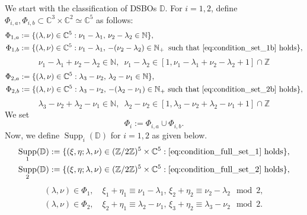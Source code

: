 \documentclass[a4paper,11pt,reqno]{amsart}
\newcommand{\DD}{\mathbb{D}}
\newcommand{\0}{{\bf 0}}
\newcommand{\N}{\mathbb{N}}
\newcommand{\Z}{\mathbb{Z}}
\newcommand{\C}{\mathbb{C}}
\newcommand{\1}{{\bf 1}}
\DeclareMathOperator{\Supp}{Supp}
\theoremstyle{plain}
\theoremstyle{definition}
\numberwithin{equation}{section}
\theoremstyle{definition}
\begin{document}
We start with the classification of DSBOs $\mathbb{D}$.
For $i=1,2$, define $\Phi_{i,a}, \Phi_{i,b} \subset \C^3\times \C^2 \simeq \C^5$ 
as follows:
\begin{align}
    \Phi_{1,a} &:= \{(\lambda, \nu) \in \C^5: \nu_1-\lambda_1,\, \nu_2-\lambda_2 \in \N\},
    \label{eqn:Phi1a}\\
    \Phi_{1,b} &:= \{(\lambda, \nu) \in \C^5: \nu_1-\lambda_1,\, -(\nu_2-\lambda_2) \in \N_+ \, \text{ such that } \eqref{eq:condition_set_1b} \text{ holds}\},
\end{align}
\begin{equation}\label{eq:condition_set_1b}
    \nu_1-\lambda_1 + \nu_2 - \lambda_2 \in \N, \enspace \nu_1-\lambda_2 \in [1, \nu_1-\lambda_1 + \nu_2 - \lambda_2+1]\cap \Z
\end{equation}
\begin{align*}
    \Phi_{2,a} &:= \{(\lambda, \nu) \in \C^5: \lambda_3-\nu_2,\, \lambda_2-\nu_1 \in \N\},\\
    \Phi_{2,b} &:= \{(\lambda, \nu) \in \C^5: \lambda_3-\nu_2,\, -(\lambda_2 - \nu_1)\in \N_+ \text{ such that } \eqref{eq:condition_set_2b} \text{ holds}\},
\end{align*}
\begin{equation}\label{eq:condition_set_2b}
\lambda_3 - \nu_2 + \lambda_2-\nu_1 \in \N, \enspace\lambda_2 - \nu_2 \in [1, \lambda_3 - \nu_2 + \lambda_2-\nu_1 + 1]\cap \Z
\end{equation}
We set 
\begin{equation*}
\Phi_i := \Phi_{i,a}\cup \Phi_{i,b}.
\end{equation*} 
Now, we define $\Supp_i(\DD)$ for $i=1,2$  as given below.
\begin{align*}
    \Supp_1(\DD) &:= \{(\xi, \eta; \lambda, \nu) \in (\Z/2\Z)^5 \times \C^5: \eqref{eq:condition_full_set_1} \text{ holds}\},\\
    \Supp_2(\DD) &:= \{(\xi, \eta; \lambda, \nu) \in (\Z/2\Z)^5 \times \C^5: \eqref{eq:condition_full_set_2} \text{ holds}\},
\end{align*}
\begin{align}
\label{eq:condition_full_set_1}
    (\lambda, \nu) \in \Phi_1, \quad \xi_1+\eta_1 \equiv \nu_1-\lambda_1,\, \xi_2+\eta_2 \equiv \nu_2-\lambda_2 \mod{2},\\
\label{eq:condition_full_set_2}
    (\lambda, \nu) \in \Phi_2, \quad \xi_2+\eta_1 \equiv \lambda_2-\nu_1,\, \xi_3+\eta_2 \equiv \lambda_3-\nu_2 \mod{2}.
\end{align}
\end{document}
